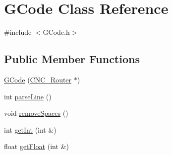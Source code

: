 \hypertarget{class_g_code}{\section{G\+Code Class Reference}
\label{class_g_code}
}


{\ttfamily \#include $<$G\+Code.\+h$>$}

\subsection*{Public Member Functions}
\begin{DoxyCompactItemize}
\item 
\hyperlink{class_g_code_afb47ef5c3500e0534e54607abfd73d47}{G\+Code} (\hyperlink{class_c_n_c___router}{C\+N\+C\+\_\+\+Router} $\ast$)
\item 
int \hyperlink{class_g_code_a1785db665332977787a38b6b2563b395}{parse\+Line} ()
\item 
void \hyperlink{class_g_code_a3912e1dad7257e2336ab09c55ff17235}{remove\+Spaces} ()
\item 
int \hyperlink{class_g_code_a609aaf5606ffd2013a957e97641b1530}{get\+Int} (int \&)
\item 
float \hyperlink{class_g_code_a34f2977443578a7ba002efa2aa88dde0}{get\+Float} (int \&)
\end{DoxyCompactItemize}
